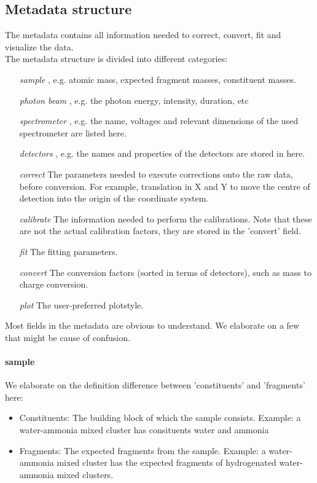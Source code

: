 \subsection{Metadata structure}
The metadata contains all information needed to correct, convert, fit and visualize the data.
\\
The metadata structure is divided into different categories:
\begin{itemize}
\item[\emph{sample}], e.g. atomic mass, expected fragment masses, constituent masses.
\item[\emph{photon beam}], e.g. the photon energy, intensity, duration, etc
\item[\emph{spectrometer}],  e.g. the name, voltages and relevant dimensions of the used spectrometer are listed here.
\item[\emph{detectors}], e.g. the names and properties of the detectors are stored in here.
\item[\emph{correct}] The parameters needed to execute corrections onto the raw data, before conversion. For example, translation in X and Y to move the centre of detection into the origin of the coordinate system.
\item[\emph{calibrate}] The information needed to perform the calibrations. Note that these are not the actual calibration factors, they are stored in the 'convert' field.
\item[\emph{fit}] The fitting parameters.
\item[\emph{convert}] The conversion factors (sorted in terms of detectors), such as mass to charge conversion.
\item[\emph{plot}] The user-preferred plotstyle.
\end{itemize}

Most fields in the metadata are obvious to understand. We elaborate on a few that might be cause of confusion.

\paragraph{sample}
 We elaborate on the definition difference between 'constituents' and 'fragments' here:
\begin{itemize}
\item Constituents: The building block of which the sample consists. Example: a water-ammonia mixed cluster has consituents water and ammonia
\item Fragments: The expected fragments from the sample. Example: a water-ammonia mixed cluster has the expected fragments of hydrogenated water-ammonia mixed clusters.
\end{itemize}


